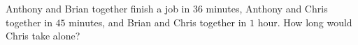 Anthony and Brian together finish a job in $36$ minutes, Anthony and Chris together in $45$ minutes, and Brian and Chris together in $1$ hour. How long would Chris take alone?
